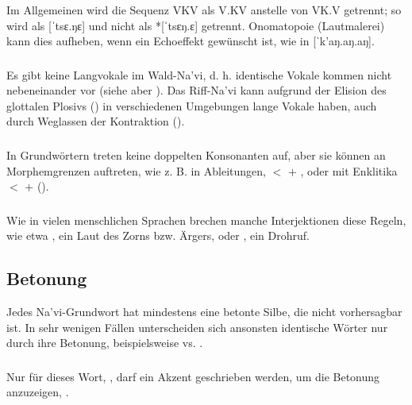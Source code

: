 \subsubsection{} Im Allgemeinen wird die Sequenz VKV als V.KV anstelle von VK.V getrennt; so wird  als [ˈtsɛ.ŋɛ] und nicht als *[ˈtsɛŋ.ɛ] getrennt. Onomatopoie (Lautmalerei) kann dies aufheben, wenn ein Echoeffekt gewünscht ist, wie in  [ˈk'aŋ.aŋ.aŋ].

\subsubsection{} Es gibt keine Langvokale im Wald-Na'vi, d. h. identische Vokale kommen nicht nebeneinander vor (siehe aber ). Das Riff-Na'vi kann aufgrund der Elision des glottalen Plosivs () in verschiedenen Umgebungen lange Vokale haben, auch durch Weglassen der Kontraktion ().

\subsubsection{} In Grundwörtern treten keine doppelten Konsonanten auf, aber sie können an Morphemgrenzen auftreten, wie z. B. in Ableitungen,  $<$  $+$ , oder mit Enklitika  $<$  $+$  ().

\subsubsection{} Wie in vielen menschlichen Sprachen brechen manche Interjektionen diese Regeln, wie etwa , ein Laut des Zorns bzw. Ärgers, oder , ein Drohruf.

\subsection{Betonung}
Jedes Na'vi-Grundwort hat mindestens eine betonte Silbe, die nicht vorhersagbar ist. In sehr wenigen Fällen unterscheiden sich ansonsten identische Wörter nur durch ihre Betonung, beispielsweise   vs.  .

\subsubsection{} Nur für dieses Wort, , darf ein Akzent geschrieben werden, um die Betonung anzuzeigen, .

